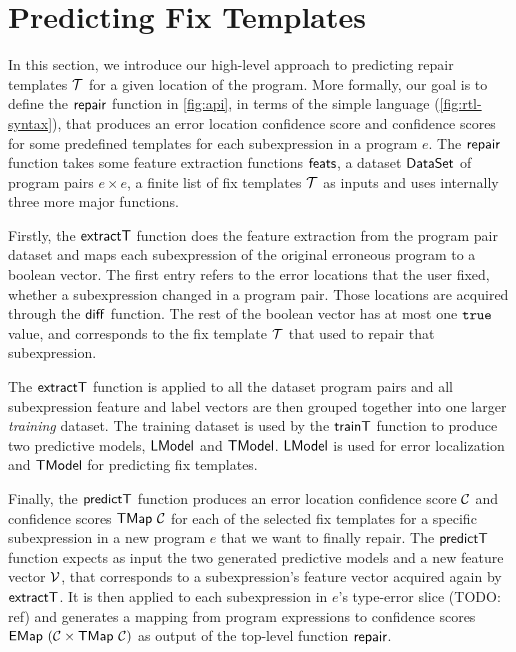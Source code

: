 \section{Predicting Fix Templates}
\label{sec:templ-pred}

In this section, we introduce our high-level approach to predicting repair
templates $\mathcal{T}$ for a given location of the program. More formally, our goal is
to define the $\mathsf{repair}$ function in \autoref{fig:api}, in terms of the simple
language \repairLang (\autoref{fig:rtl-syntax}), that produces an error location
confidence score and confidence scores for some predefined templates for each
subexpression in a program $e$. The $\mathsf{repair}$ function takes some feature
extraction functions $\mathsf{feats}$, a dataset $\mathsf{DataSet}$ of program pairs $e
\times e$, a finite list of fix templates $\mathcal{T}$ as inputs and uses internally
three more major functions.

Firstly, the $\mathsf{extractT}$ function does the feature extraction from the
program pair dataset and maps each subexpression of the original erroneous
program to a boolean vector. The first entry refers to the error locations that
the user fixed, \ie whether a subexpression changed in a program pair. Those
locations are acquired through the $\mathsf{diff}$ function. The rest of the boolean
vector has at most one $\mathtt{true}$ value, and corresponds to the fix template $\mathcal{T}$
that used to repair that subexpression.

The $\mathsf{extractT}$ function is applied to all the dataset program pairs and all
subexpression feature and label vectors are then grouped together into one
larger \emph{training} dataset. The training dataset is used by the $\mathsf{trainT}$
function to produce two predictive models, $\mathsf{LModel}$ and $\mathsf{TModel}$. $\mathsf{LModel}$ is
used for error localization and $\mathsf{TModel}$ for predicting fix templates.

Finally, the $\mathsf{predictT}$ function produces an error location confidence score
$\mathcal{C}$ and confidence scores $\mathsf{TMap}\ \mathcal{C}$ for each of the selected fix
templates for a specific subexpression in a new program $e$ that we want to
finally repair. The $\mathsf{predictT}$ function expects as input the two generated
predictive models and a new feature vector $\mathcal{V}$, that corresponds to a
subexpression's feature vector acquired again by $\mathsf{extractT}$. It is then
applied to each subexpression in $e$'s type-error slice (TODO: ref) and
generates a mapping from program expressions to confidence scores $\mathsf{EMap}\ (\mathcal{C}
\times \mathsf{TMap}\ \mathcal{C})$ as output of the top-level function $\mathsf{repair}$.

